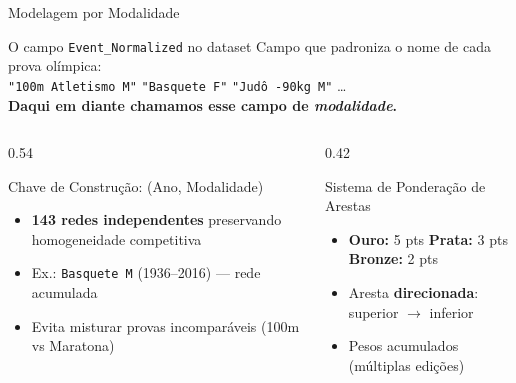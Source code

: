 \begin{frame}{Modelagem por Modalidade}
    \begin{block}{O campo \texttt{Event\_Normalized} no dataset}
        \footnotesize
        Campo que padroniza o nome de cada prova olímpica:\\[0.15cm]
        \texttt{"100m Atletismo M"} \quad \texttt{"Basquete F"} \quad \texttt{"Judô -90kg M"} \quad \ldots\\[0.2cm]
        \textbf{Daqui em diante chamamos esse campo de \textit{modalidade}.}
    \end{block}

    \vspace{0.2cm}

    \begin{columns}[T]
        \begin{column}{0.54\textwidth}
            \begin{block}{Chave de Construção: (Ano, Modalidade)}
                \footnotesize
                \begin{itemize}
                    \item \textbf{143 redes independentes} preservando homogeneidade competitiva
                    \item Ex.: \texttt{Basquete M} (1936--2016) --- rede acumulada
                    \item Evita misturar provas incomparáveis (100m vs Maratona)
                \end{itemize}
            \end{block}
        \end{column}
        \begin{column}{0.42\textwidth}
            \begin{block}{Sistema de Ponderação de Arestas}
                \footnotesize
                \begin{itemize}
                    \item \textbf{Ouro:} 5 pts \quad \textbf{Prata:} 3 pts \quad \textbf{Bronze:} 2 pts
                    \item Aresta \textbf{direcionada}: superior $\rightarrow$ inferior
                    \item Pesos acumulados (múltiplas edições)
                \end{itemize}
            \end{block}
        \end{column}
    \end{columns}
\end{frame}

